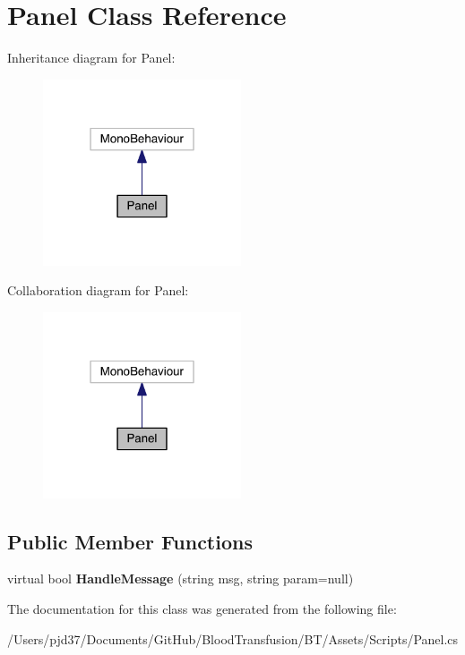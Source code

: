 \hypertarget{class_panel}{}\section{Panel Class Reference}
\label{class_panel}


Inheritance diagram for Panel\+:\nopagebreak
\begin{figure}[H]
\begin{center}
\leavevmode
\includegraphics[width=166pt]{class_panel__inherit__graph}
\end{center}
\end{figure}


Collaboration diagram for Panel\+:\nopagebreak
\begin{figure}[H]
\begin{center}
\leavevmode
\includegraphics[width=166pt]{class_panel__coll__graph}
\end{center}
\end{figure}
\subsection*{Public Member Functions}
\begin{DoxyCompactItemize}
\item 
virtual bool {\bfseries Handle\+Message} (string msg, string param=null)\hypertarget{class_panel_a3ff8f581f8f10db023407269619756ae}{}\label{class_panel_a3ff8f581f8f10db023407269619756ae}

\end{DoxyCompactItemize}


The documentation for this class was generated from the following file\+:\begin{DoxyCompactItemize}
\item 
/\+Users/pjd37/\+Documents/\+Git\+Hub/\+Blood\+Transfusion/\+B\+T/\+Assets/\+Scripts/Panel.\+cs\end{DoxyCompactItemize}

